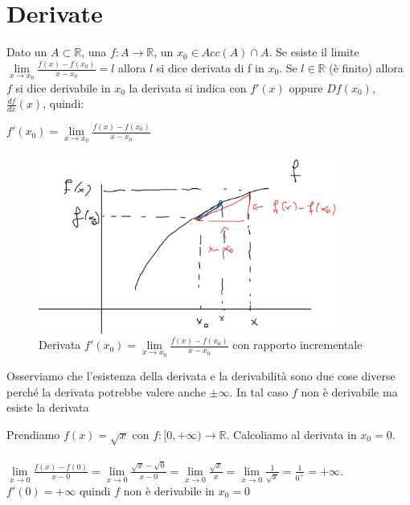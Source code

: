 \newpage
\section{Derivate}
\begin{definition}[Derivata]
    Dato un $A\subset \mathbb{R}$, una $f: A \to \mathbb{R}$, un $x_0 \in Acc(A) \cap A$. Se esiste il limite $\lim\limits_{x\to x_0}\frac{f(x) - f(x_0)}{x - x_0} = l$ allora $l$ si dice derivata di f in $x_0$. Se $l \in \mathbb{R}$ (è finito) allora $f$ si dice derivabile in $x_0$ la derivata si indica con $f'(x)$ oppure $Df(x_0)$, $\frac{df}{dx}(x)$, quindi:
    \begin{center}
        $f'(x_0) = \lim\limits_{x\to x_0}\frac{f(x) - f(x_0)}{x - x_0}$
    \end{center}
\end{definition}

\begin{figure}[h!]
    \vspace{-25pt}
    \centering
    \includegraphics[width=10cm]{images/derivata-rapporto-incrementale.png}
    \vspace{-5pt}
    \caption{Derivata $f'(x_0) = \lim\limits_{x\to x_0}\frac{f(x) - f(x_0)}{x - x_0}$ con rapporto incrementale}
\end{figure}

\begin{observation}
Osserviamo che l'esistenza della derivata e la derivabilità sono due cose diverse perché la derivata potrebbe valere anche $\pm \infty$. In tal caso $f$ non è derivabile ma esiste la derivata
\end{observation}

\begin{example}
Prendiamo $f(x) = \sqrt{x}$ con $f: [0,+\infty) \to \mathbb{R}$. Calcoliamo al derivata in $x_0 = 0$.\\\\
$\lim\limits_{x\to 0}\frac{f(x) - f(0)}{x - 0} = \lim\limits_{x\to 0}\frac{\sqrt{x} - \sqrt{0}}{x - 0} = \lim\limits_{x\to 0}\frac{\sqrt{x}}{x} = \lim\limits_{x\to 0}\frac{1}{\sqrt{x}} = \frac{1}{0^+} = +\infty$.\\
$f'(0) = +\infty$ quindi $f$ non è derivabile in $x_0 = 0$
\end{example}

